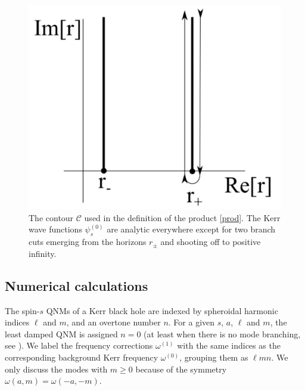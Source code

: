 \begin{refsection}
\begin{figure}[t]
\includegraphics[width=1.0\columnwidth]{chapter_KN_QNM/etc/contour1}
\caption{The contour $\mathscr{C}$ used in the definition of the product \eqref{prod}. The Kerr wave functions $\psi_s^{(0)}$ are analytic everywhere except for two branch cuts emerging from the horizons $r_\pm$ and shooting off to positive infinity. }
\label{fig:contour}
\end{figure}

\subsection{Numerical calculations} 
The spin-$s$ QNMs of a Kerr black hole are indexed by spheroidal harmonic indices $\ell$ and $m$, and an overtone number $n$. For a given $s$, $a$, $\ell$ and $m$, the least damped QNM is assigned $n=0$ (at least when there is no mode branching, see \cite{Yang2012b}).
We label the frequency corrections $\omega^{(1)}$ with the same indices as the corresponding background Kerr frequency $\omega^{(0)}$, grouping them as $\ell m n$. We only discuss the modes with $m \geq 0$ because of the symmetry $\omega(a,m) = \omega(-a,-m)$.


\end{refsection}
